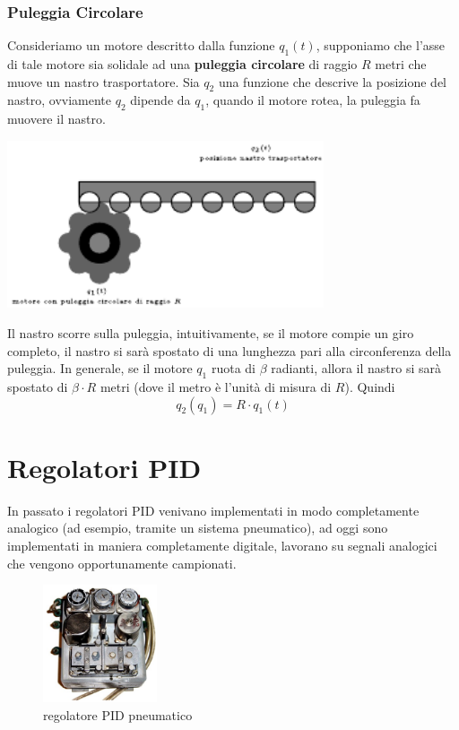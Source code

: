 \documentclass[10pt, letterpaper]{report}
\begin{document}
\subsection{Puleggia Circolare}
Consideriamo un motore descritto dalla funzione $q_1(t)$, supponiamo che l'asse di tale motore sia solidale ad una \textbf{puleggia circolare} di raggio $R$ metri che muove un nastro trasportatore. Sia $q_2$ una funzione che descrive la posizione del nastro, ovviamente $q_2$ dipende da $q_1$, quando il motore rotea, la puleggia fa muovere il nastro.
\begin{center}
    \includegraphics[width=0.7\textwidth]{images/puleggia.pdf}
\end{center}
Il nastro scorre sulla puleggia, intuitivamente, se il motore compie un giro completo, il nastro si sarà spostato di una lunghezza pari alla circonferenza della puleggia.\acc 
In generale, se il motore $q_1$ ruota di $\beta$ radianti, allora il nastro si sarà spostato di $\beta\cdot R$ metri (dove il metro è l'unità di misura di $R$). Quindi 
$$q_2(q_1)=R\cdot q_1(t) $$

\chapter{Regolatori PID}\label{regolatoriPID}
In passato i regolatori PID venivano implementati in modo completamente analogico (ad esempio, tramite un sistema pneumatico), ad oggi sono implementati in maniera completamente digitale, lavorano su segnali analogici che vengono opportunamente campionati.\acc
\begin{figure}[h!]
    \centering 
    \includegraphics[width=0.3\textwidth]{images/pidPneumatico.png}
    \caption{regolatore PID pneumatico}
\end{figure}
\end{document}
